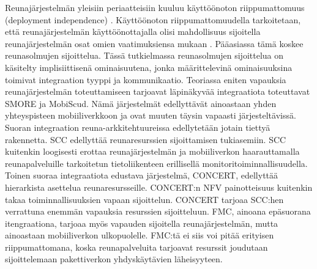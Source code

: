 Reunajärjestelmän yleisiin periaatteisiin kuuluu käyttöönoton riippumattomuus (deployment independence) \cite{etsitechreq}.
Käyttöönoton riippumattomuudella tarkoitetaan, että reunajärjestelmän käyttöönottajalla olisi mahdollisuus sijoitella reunajärjestelmän osat omien vaatimuksiensa mukaan \cite{etsitechreq}. Pääasiassa tämä koskee reunasolmujen sijoittelua. Tässä tutkielmassa reunasolmujen sijoittelua on käsitelty implisiittisenä ominaisuutena, jonka määrittelevinä ominaisuuksina toimivat integraation tyyppi ja kommunikaatio. 
Teoriassa eniten vapauksia reunajärjestelmän toteuttamiseen tarjoavat läpinäkyvää integraatiota toteuttavat SMORE ja MobiScud.
Nämä järjestelmät edellyttävät ainoastaan yhden yhteyspisteen mobiiliverkkoon ja ovat muuten täysin vapaasti järjesteltävissä.
Suoran integraation reuna-arkkitehtuureissa edellytetään jotain tiettyä rakennetta. 
SCC edellyttää reunaresurssien sijoittamisen tukiasemiin. SCC kuitenkin loogisesti erottaa reunajärjestelmän ja mobiiliverkon haarauttamalla reunapalveluille tarkoitetun tietoliikenteen erillisellä monitoritoiminnallisuudella.
Toinen suoraa integraatiota edustava järjestelmä, CONCERT, edellyttää hierarkista asettelua reunaresursseille. CONCERT:n NFV painotteisuus kuitenkin takaa toiminnallisuuksien vapaan sijoittelun. CONCERT tarjoaa SCC:hen verrattuna enemmän vapauksia resurssien sijoitteluun.
FMC, ainoana epäsuorana itengraationa, tarjoaa myös vapauden sijoitella reunajärjestelmän, mutta ainoastaan mobiiliverkon ulkopuolelle.
FMC:tä ei siis voi pitää erityisen riippumattomana, koska reunapalveluita tarjoavat resurssit joudutaan sijoittelemaan pakettiverkon yhdyskäytävien läheisyyteen.

